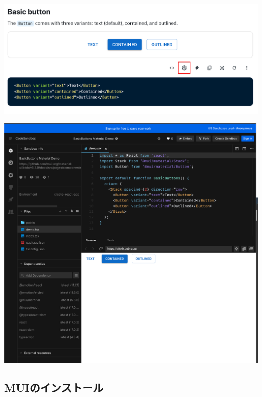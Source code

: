 \begin{reviewimage}%
\includegraphics[width=0.6\maxwidth]{./images/03-todo-with-react/mui001-mui_compo_sample.png}%
\label{image:03-todo-with-react:mui001-mui_compo_sample}
\end{reviewimage}
\begin{reviewimage}%
\includegraphics[width=0.6\maxwidth]{./images/03-todo-with-react/mui002-codesandbox.png}%
\label{image:03-todo-with-react:mui002-codesandbox}
\end{reviewimage}

\subsection{MUIのインストール}
\keeplastskip{
  \label{sec:3-3-1}
  \label{sec-0330Install}
  \par\nobreak
}

